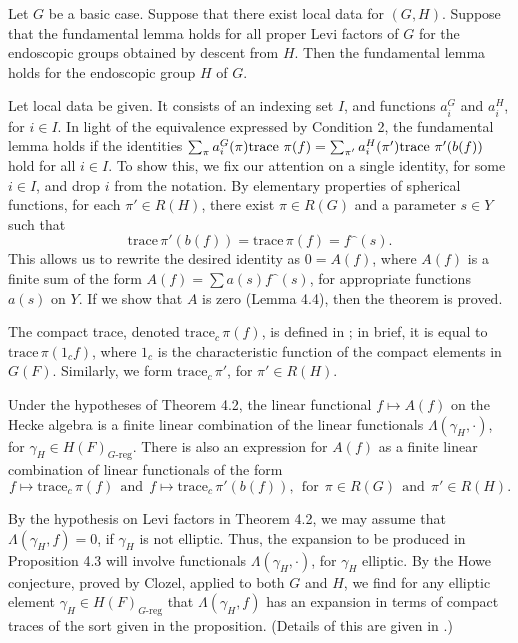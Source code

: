   Let $G$ be a basic case.
Suppose that there exist local data
for $(G,H)$.  Suppose that the fundamental lemma holds for all proper
Levi factors of $G$ for the endoscopic groups obtained
by descent from $H$.  Then the fundamental lemma holds
for the endoscopic group $H$ of $G$.
\endproclaim

Let local data be given.  It consists of an indexing
set $I$, and functions $a_i^G$ and $a_i^H$, for $i\in I$.  In
light of the equivalence expressed by Condition 2, the fundamental
lemma holds if the identities
$\sum_\pi a^G_i(\pi)\text{trace\,}\,\pi(f) =
   \sum_{\pi'} a_i^H(\pi')\text{trace\,}\,\pi'(b(f))$
hold for all $i\in I$.  
To show this, we fix our attention
on a single identity, for some $i\in I$, and drop $i$ from the notation.
By elementary
properties of spherical functions, for each $\pi'\in R(H)$, 
there exist
 $\pi\in R(G)$ and a parameter $s\in Y$ such that
$$ \text{trace}\,\pi'(b(f)) = \text{trace}\,\pi(f)= f\hat{\phantom{o}}(s).$$
This allows us to rewrite the desired identity as 
$0=A(f)$, where $A(f)$ is a finite sum of the
form $A(f) = \sum a(s) f\hat{\phantom{o}}(s)$, for
appropriate functions $a(s)$ on $Y$.  If we show that $A$ is
zero (Lemma 4.4), then the theorem is proved.

The compact trace, denoted $\text{trace}_c\,\pi(f)$, is defined
in \cite{Cl1}; in brief, it is equal to $\text{trace}\,\pi(1_cf)$, where
$1_c$ is the characteristic function of the compact elements in $G(F)$.
Similarly, we form $\text{trace}_c\,\pi'$, for
$\pi'\in R(H)$.  


Under the hypotheses of Theorem 4.2, the linear functional
$f\mapsto A(f)$ on the Hecke algebra is a finite linear combination of
the linear functionals $\Lambda(\gamma_H,\cdot)$, for 
$\gamma_H\in H(F)_{G\text{-reg}}$.
There is also an expression for $A(f)$
as a finite linear combination of linear functionals of the form
$$f\mapsto \text{trace}_c\,\pi(f)\ \ \text{and}\ \ 
  f\mapsto \text{trace}_c\,\pi'(b(f)),\ \ \text{for} \ \
  \pi\in R(G)\ \ \text{and}\ \ \pi'\in R(H).$$
\endproclaim

By the hypothesis on Levi factors in Theorem 4.2, we
may assume that $\Lambda(\gamma_H,f)=0$, if $\gamma_H$ is not
elliptic.  Thus, the expansion to be produced in Proposition 4.3 will
involve functionals $\Lambda(\gamma_H,\cdot)$, for $\gamma_H$ elliptic.
By the Howe conjecture, proved by Clozel, applied to
both $G$ and $H$, we find for any elliptic
element $\gamma_H\in H(F)_{G\text{-reg}}$ that $\Lambda(\gamma_H,f)$ has an
expansion in terms of compact traces of the sort given
in the proposition.  (Details of this are given in \cite{H1,1}.)  

